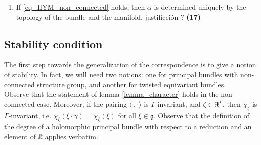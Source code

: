 {\begin{obs}
\begin{enumerate}
        \[
            P_{\hat{K}} \times_{\hat{K}} \mathfrak{z}_K \longrightarrow Y \times_\Gamma \mathfrak{z}_K, \ [p, \zeta] \mapsto [\hat{\pi}(p), \zeta] \ {\color{red}?}
        \]
        where \(\hat{\pi}\colon P_{\hat{G}}\to Y\) is the natural projection (which we restrict to \(P_{\hat{K}}\)). {\color{red} No entiendo como seguimos}. A reduction of the structure group to \(\hat{K}\) satisfying \(\Lambda_\omega F_A=-\ii \alpha\) is called an \(\alpha\)\textit{-Hermite-Yang-Mills reduction of the structure group}.
        \item If \eqref{eq_HYM_non_connected} holds, then \(\alpha\) is determined uniquely by the topology of the bundle and the manifold. {\color{red} justificción ?} \textbf{(17)}
    \end{enumerate}
\end{obs}

\subsection{Stability condition}
The first step towards the generalization of the correspondence is to give a notion of stability. In fact, we will need two notions: one for principal bundles with non-connected structure group, and another for twisted equivariant bundles. \\

Observe that the statement of lemma \ref{lemma_character} holds in the non-connected case. Moreover, if the pairing \(\langle \cdot, \cdot \rangle\) is \(\Gamma\)-invariant, and \(\zeta \in \ii \mathfrak{k}^\Gamma\), then \(\chi_\zeta\) is \(\Gamma\)-invariant, i.e. \(\chi_\zeta(\xi \cdot \gamma)=\chi_\zeta(\xi)\) for all \(\xi \in \mathfrak{g}\). Observe that the definition of the degree of a holomorphic principal bundle with respect to a reduction and an element of \(\ii \mathfrak{k}\) applies verbatim. \newline\newline

}
